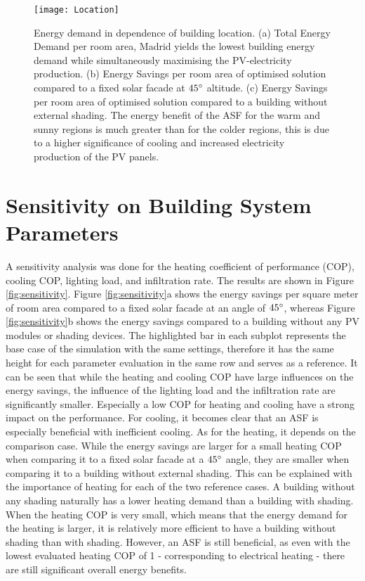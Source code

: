	\begin{figure*}
		\begin{center}
		\texttt{[image: Location]}
		\caption{Energy demand in dependence of building location. (a) Total Energy Demand per room area, Madrid yields the lowest building energy demand while simultaneously maximising the PV-electricity production. (b) Energy Savings per room area of optimised solution compared to a fixed solar facade at $45\degree$ altitude. (c) Energy Savings per room area of optimised solution compared to a building without external shading. The energy benefit of the ASF for the warm and sunny regions is much greater than for the colder regions, this is due to a higher significance of cooling and increased electricity production of the PV panels.}
		\label{fig:buildingLocation}
		\end{center}
	\end{figure*}
\section{Sensitivity on Building System Parameters}

	A sensitivity analysis was done for the heating coefficient of performance (COP), cooling COP, lighting load, and infiltration rate. The results are shown in Figure \ref{fig:sensitivity}. Figure \ref{fig:sensitivity}a shows the energy savings per square meter of room area compared to a fixed solar facade at an angle of $45\degree$, whereas Figure \ref{fig:sensitivity}b shows the energy savings compared to a building without any PV modules or shading devices. The highlighted bar in each subplot represents the base case of the simulation with the same settings, therefore it has the same height for each parameter evaluation in the same row and serves as a reference. It can be seen that while the heating and cooling COP have large influences on the energy savings, the influence of the lighting load and the infiltration rate are significantly smaller. Especially a low COP for heating and cooling have a strong impact on the performance. For cooling, it becomes clear that an ASF is especially beneficial with inefficient cooling. As for the heating, it depends on the comparison case. While the energy savings are larger for a small heating COP when comparing it to a fixed solar facade at a $45\degree$ angle, they are smaller when comparing it to a building without external shading. This can be explained with the importance of heating for each of the two reference cases. A building without any shading naturally has a lower heating demand than a building with shading. When the heating COP is very small, which means that the energy demand for the heating is larger, it is relatively more efficient to have a building without shading than with shading. However, an ASF is still beneficial, as even with the lowest evaluated heating COP of 1 - corresponding to electrical heating - there are still significant overall energy benefits. 

